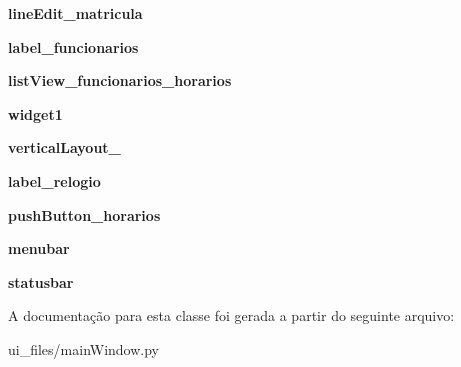 \begin{DoxyCompactItemize}
\item 
\hypertarget{classmainWindow_1_1Ui__Controle__De__Acesso__Window_a48f023e109e602c1aabf933151d046d4}{{\bfseries line\-Edit\-\_\-matricula}}\label{classmainWindow_1_1Ui__Controle__De__Acesso__Window_a48f023e109e602c1aabf933151d046d4}

\item 
\hypertarget{classmainWindow_1_1Ui__Controle__De__Acesso__Window_ae6be679b5fc7038cd82398f877106585}{{\bfseries label\-\_\-funcionarios}}\label{classmainWindow_1_1Ui__Controle__De__Acesso__Window_ae6be679b5fc7038cd82398f877106585}

\item 
\hypertarget{classmainWindow_1_1Ui__Controle__De__Acesso__Window_a2584ca019427390c63b60a9efae92a42}{{\bfseries list\-View\-\_\-funcionarios\-\_\-horarios}}\label{classmainWindow_1_1Ui__Controle__De__Acesso__Window_a2584ca019427390c63b60a9efae92a42}

\item 
\hypertarget{classmainWindow_1_1Ui__Controle__De__Acesso__Window_a92cc95580a71af0c69a74d143f2c3b5f}{{\bfseries widget1}}\label{classmainWindow_1_1Ui__Controle__De__Acesso__Window_a92cc95580a71af0c69a74d143f2c3b5f}

\item 
\hypertarget{classmainWindow_1_1Ui__Controle__De__Acesso__Window_ada7185e2e88b52b62e5b656902373c82}{{\bfseries vertical\-Layout\-\_}}\label{classmainWindow_1_1Ui__Controle__De__Acesso__Window_ada7185e2e88b52b62e5b656902373c82}

\item 
\hypertarget{classmainWindow_1_1Ui__Controle__De__Acesso__Window_a3e9759664d127243ce7df5753c84b7ba}{{\bfseries label\-\_\-relogio}}\label{classmainWindow_1_1Ui__Controle__De__Acesso__Window_a3e9759664d127243ce7df5753c84b7ba}

\item 
\hypertarget{classmainWindow_1_1Ui__Controle__De__Acesso__Window_a125cd91b57cd17d7091f17bc382e4ef3}{{\bfseries push\-Button\-\_\-horarios}}\label{classmainWindow_1_1Ui__Controle__De__Acesso__Window_a125cd91b57cd17d7091f17bc382e4ef3}

\item 
\hypertarget{classmainWindow_1_1Ui__Controle__De__Acesso__Window_ab8171508ecab078195cfe2338a8e5da2}{{\bfseries menubar}}\label{classmainWindow_1_1Ui__Controle__De__Acesso__Window_ab8171508ecab078195cfe2338a8e5da2}

\item 
\hypertarget{classmainWindow_1_1Ui__Controle__De__Acesso__Window_a4a29c9f34ae5d5c4bcfcbc71675e695f}{{\bfseries statusbar}}\label{classmainWindow_1_1Ui__Controle__De__Acesso__Window_a4a29c9f34ae5d5c4bcfcbc71675e695f}

\end{DoxyCompactItemize}


\-A documentação para esta classe foi gerada a partir do seguinte arquivo\-:\begin{DoxyCompactItemize}
\item 
ui\-\_\-files/main\-Window.\-py\end{DoxyCompactItemize}
